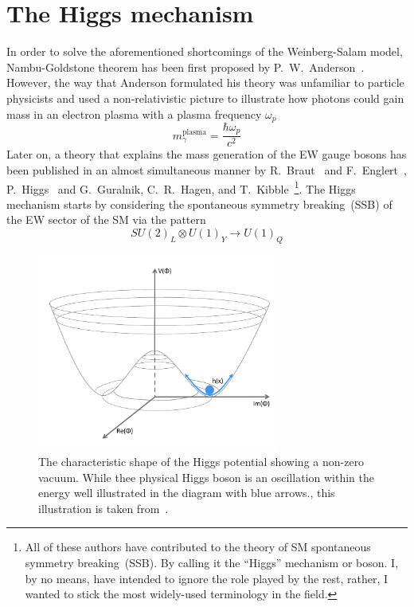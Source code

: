 \section{The Higgs mechanism  \label{Higgsmech}}
In order to solve the aforementioned shortcomings of the Weinberg-Salam model, Nambu-Goldstone theorem has been first proposed by P.~W.~Anderson~\cite{PhysRev.130.439}. However, the way that Anderson formulated his theory was unfamiliar to particle physicists and used a non-relativistic picture to illustrate how photons could gain mass in an electron plasma with a plasma frequency $\omega_{p}$ 
\begin{equation}
    m_\gamma^{\mathrm{plasma}} =\frac{\hbar \omega_p}{c^2}
\end{equation}
Later on, a theory that explains the mass generation of the EW gauge bosons has been published in an almost simultaneous manner by R.~Braut~ and F.~Englert~\cite{PhysRevLett.13.321}, P.~Higgs~\cite{PhysRevLett.13.508} and G.~Guralnik, C.~R.~Hagen, and T.~Kibble~\cite{PhysRevLett.13.585,Guralnik:2009jd}\footnote{All of these authors have contributed to the theory of SM spontaneous symmetry breaking~(SSB). By calling it the ``Higgs'' mechanism or boson. I, by no means, have intended to ignore the role played by the rest, rather, I wanted to stick the most widely-used terminology in the field.}.
The Higgs mechanism starts by considering the spontaneous symmetry breaking~(SSB) of the EW sector of the SM via the pattern
\begin{equation}
    SU(2)_L \otimes U(1)_Y \longrightarrow U(1)_{Q} 
\end{equation}
\begin{figure}[t!]
	\begin{center}
		\includegraphics[width=8cm]{figures/HiggsPotential}
		\caption{The characteristic shape of the Higgs potential showing a non-zero vacuum. While thee physical Higgs boson is an oscillation within the energy well illustrated in the diagram with blue arrows., this illustration is taken from~\cite{Erler:2019hds}. \label{fig:higgs_hat} }
	\end{center}
\end{figure}
